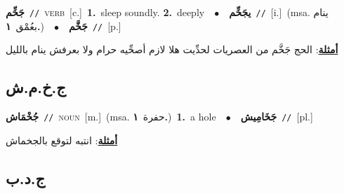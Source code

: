 \documentclass[10pt,a4paper,twoside]{article} %
\begin{document}
\begin{multicols}{2}
{{{{{{{{{{{\setlength\topsep{0pt}\textbf{\foreignlanguage{arabic}{جَخِّم}}\ {\color{gray}\texttt{//}\color{black}}\ \textsc{verb}\ [c.]\ \textbf{1.}~sleep soundly.  \textbf{2.}~deeply\ \ $\bullet$\ \ \setlength\topsep{0pt}\textbf{\foreignlanguage{arabic}{يجَخِّم}}\ {\color{gray}\texttt{//}\color{black}}\ [i.]\ \color{gray}(msa. \foreignlanguage{arabic}{ينام بعُمْق}~\foreignlanguage{arabic}{\textbf{١.}})\color{black}\ \ $\bullet$\ \ \setlength\topsep{0pt}\textbf{\foreignlanguage{arabic}{جَخَّم}}\ {\color{gray}\texttt{//}\color{black}}\ [p.]\  \begin{flushright}\color{gray}\foreignlanguage{arabic}{\textbf{\underline{\foreignlanguage{arabic}{أمثلة}}}: الحج جَخَّم من العصريات لحدِّيت هلا لازم أصحِّيه حرام ولا بعرفش ينام بالليل}\end{flushright}\color{black}} \vspace{2mm}

\vspace{-3mm}
\subsection*{\color{blue}\foreignlanguage{arabic}{ج.خ.م.ش}\color{blue}{}} 

{\setlength\topsep{0pt}\textbf{\foreignlanguage{arabic}{جُخْمَاش}}\ {\color{gray}\texttt{//}\color{black}}\ \textsc{noun}\ [m.]\ \color{gray}(msa. \foreignlanguage{arabic}{حفرة}~\foreignlanguage{arabic}{\textbf{١.}})\color{black}\ \textbf{1.}~a hole\ \ $\bullet$\ \ \setlength\topsep{0pt}\textbf{\foreignlanguage{arabic}{جَخَامِيش}}\ {\color{gray}\texttt{//}\color{black}}\ [pl.]\  \begin{flushright}\color{gray}\foreignlanguage{arabic}{\textbf{\underline{\foreignlanguage{arabic}{أمثلة}}}: انتبه لتوقع بالجخماش}\end{flushright}\color{black}} \vspace{2mm}

\vspace{-3mm}
\subsection*{\color{blue}\foreignlanguage{arabic}{ج.د.ب}\color{blue}{}} 

}}}}}}}}}}
\end{multicols}
\end{document}
